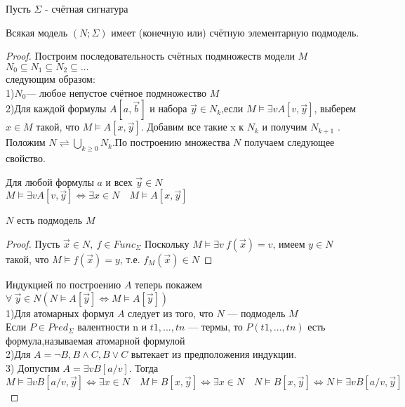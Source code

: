 Пусть $\Sigma$ - счётная сигнатура
\begin{theorem}
	Всякая модель  $(N ;\Sigma)$ имеет (конечную или) счётную элементарную подмодель.
\end{theorem}
\begin{proof}
	Построим последовательность счётных подмножеств модели $M$\\
	$N_{0} \subseteq N_{1} \subseteq N_{2} \subseteq \ldots$\\
	следующим образом:\\
	1)$N_0$— любое непустое счётное подмножество $M$\\
	2)Для каждой формулы $A[a, \vec{b}]$ и набора $\vec{y} \in N_{k}$,если $M \vDash \exists v A[v, \vec{y}]$,
	выберем $x \in M$
	такой, что $M \vDash A[x, \vec{y}]$. Добавим все такие x к $N_k$ и получим $N_{k+1}$ .\\
	Положим $N \rightleftharpoons \bigcup_{k \geq 0} N_{k}$.По построению множества $N$ получаем следующее
	свойство.
	\begin{lemma}
		Для любой формулы $a$ и всех $\vec{y} \in N$\\
		$M \vDash \exists v A[v, \vec{y}] \Longleftrightarrow \exists x \in N \quad M \vDash A[x, \vec{y}]$
	\end{lemma}
	\begin{lemma}
		$N$ есть подмодель $M$
	\end{lemma}
	\begin{proof}
		Пусть $\vec{x} \in N,\:f\in Func_\Sigma$ Поскольку $M \vDash \exists v \: f(\vec{x})=v$, имеем $y\in N$
		такой, что $M \vDash f(\vec{x})=y$, т.е. $f_M(\vec{x})\in N$
	\end{proof}
	Индукцией по построению $A$ теперь покажем\\
	$\forall \: \vec{y}\in N (N \vDash A[\vec{y}] \Longleftrightarrow M \vDash A[\vec{y}])$\\
	1)Для атомарных формул $A$ следует из того, что $N$ — подмодель $M$\\
	\textcolor{mygray}{Если $P\in Pred_\Sigma$ валентности n и $t1, . . . ,tn$ —
	термы, то $P(t1, . . . ,tn)$ есть формула,называемая атомарной формулой}\\
	2)Для $A=\neg B, B \wedge C, B \vee C$ вытекает из предположения индукции.\\
	3) Допустим $A=\exists v B[a / v]$. Тогда\\
	$M \vDash \exists v B[a / v, \vec{y}] \Longleftrightarrow \exists x \in N \quad M \vDash B[x,
	\vec{y}]\Longleftrightarrow \exists x \in N \quad N \vDash B[x, \vec{y}] \Longleftrightarrow N \vDash \exists v
	B[a / v, \vec{y}]$
\end{proof}
